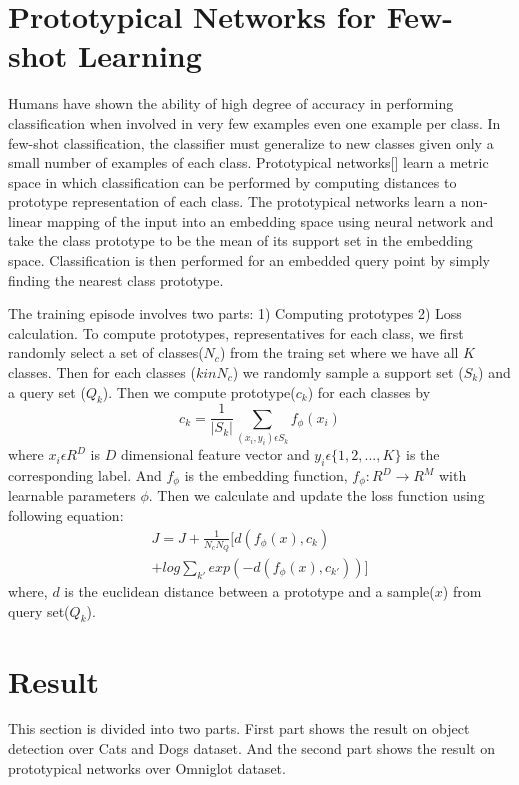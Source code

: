 \documentclass[10pt,twocolumn,letterpaper]{article}
\begin{document}
\section{Prototypical Networks for Few-shot Learning}
Humans have shown the ability of high degree of accuracy in performing classification when involved in very few examples even one example per class. In few-shot classification, the classifier must generalize to new classes given only a small number of examples of each class. Prototypical networks[] learn a metric space in which classification can be performed by computing distances to prototype representation of each class. The prototypical networks learn a non-linear mapping of the input into an embedding space using neural network and take the class prototype to be the mean of its support set in the embedding space. Classification is then performed for an embedded query point by simply finding the nearest class prototype. \cite{DBLP:journals/corr/SnellSZ17}

The training episode involves two parts: 1) Computing prototypes 2) Loss calculation. To compute prototypes, representatives for each class, we first randomly select a set of classes($N_c$) from the traing set where we have all $K$ classes. Then for each classes ($k in N_c$) we randomly sample a support set ($S_k$) and a query set ($Q_k$). Then we compute prototype($c_k$) for each classes by
\begin{equation}
c_k=\frac{1}{|S_k|}\sum_{(x_i, y_i) \epsilon S_k} f_{\phi}(x_i)
\end{equation}
where $x_i \epsilon R^D$ is $D$ dimensional feature vector and $y_i \epsilon \{1, 2,...,K\}$ is the corresponding label. And $f_\phi$ is the embedding function, $f_\phi : R^D \to R^M$ with learnable parameters $\phi$. Then we calculate and update the loss function using following equation:
\begin{equation}
\begin{split}
J=J+\frac{1}{N_c N_Q}[d(f_\phi(x), c_k) \\
                     +log \sum_{k'}exp(-d(f_\phi(x), c_{k'}))]
\end{split}
\end{equation}
where, $d$ is the euclidean distance between a prototype and a sample($x$) from query set($Q_k$).

\section{Result}
This section is divided into two parts. First part shows the result on object detection over Cats and Dogs\cite{parkhi12a} dataset. And the second part shows the result on prototypical networks over Omniglot dataset\cite{DBLP:journals/corr/abs-1902-03477}.
\end{document}
